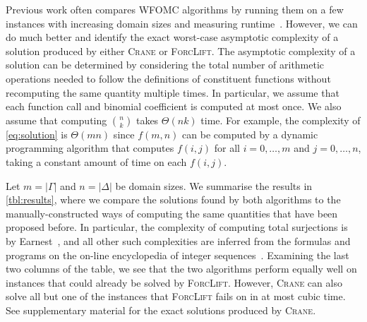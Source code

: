 \documentclass{article}
\theoremstyle{definition}
\theoremstyle{remark}
\begin{document}
Previous work often compares WFOMC algorithms by running them on a few instances
with increasing domain sizes and measuring
runtime~\cite{DBLP:conf/nips/Broeck11,DBLP:conf/ijcai/BroeckTMDR11,DBLP:conf/aaai/BroeckD12}.
However, we can do much better and identify the exact worst-case asymptotic
complexity of a solution produced by either \textsc{Crane} or \textsc{ForcLift}.
The asymptotic complexity of a solution can be determined by considering the
total number of arithmetic operations needed to follow the definitions of
constituent functions without recomputing the same quantity multiple times. In
particular, we assume that each function call and binomial coefficient is
computed at most once. We also assume that computing $\binom{n}{k}$ takes
$\Theta(nk)$ time. For example, the complexity of \cref{eq:solution} is
$\Theta(mn)$ since $f(m, n)$ can be computed by a dynamic programming algorithm
that computes $f(i, j)$ for all $i = 0, \dots, m$ and $j = 0, \dots, n$, taking
a constant amount of time on each $f(i, j)$.

Let $m = |\Gamma|$ and $n = |\Delta|$ be domain sizes. We summarise the results
in \cref{tbl:results}, where we compare the solutions found by both algorithms
to the manually-constructed ways of computing the same quantities that have been
proposed before. In particular, the complexity of computing total surjections is
by Earnest~, and all other such complexities are inferred from
the formulas and programs on the on-line encyclopedia of integer
sequences~\cite{oeis}. Examining the last two columns of the table, we see that
the two algorithms perform equally well on instances that could already be
solved by \textsc{ForcLift}. However, \textsc{Crane} can also solve all but one
of the instances that \textsc{ForcLift} fails on in at most cubic time. See
supplementary material for the exact solutions produced by \textsc{Crane}.
\end{document}

